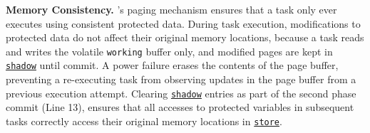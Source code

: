 

\textbf{Memory Consistency.} \sys's paging mechanism ensures that a task only ever executes using consistent
protected data. During task execution, modifications to protected data do not
affect their original memory locations, because a task reads and writes the
volatile \texttt{working} buffer only, and modified pages are kept in
\texttt{\underline{shadow}} until commit. A power failure erases the contents
of the page buffer, preventing a re-executing task from observing updates in
the page buffer from a previous execution attempt. Clearing \texttt{\underline{shadow}}
entries as part of the second phase commit (Line 13), ensures that all accesses to
protected variables in subsequent tasks correctly access their original memory
locations in \texttt{\underline{store}}.
%
